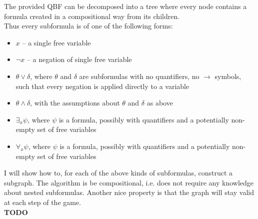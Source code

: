 \noindent
The provided QBF can be decomposed into a tree where every node contains a formula created in a compositional
way from its children.\\
Thus every subformula is of one of the following forms:
\begin{itemize}
      \item $x$ -- a single free variable
      \item $\lnot x$ -- a negation of single free variable
      \item $\theta \lor \delta$, where $\theta$ and $\delta$ are subformulas with no quantifiers, no $\rightarrow$ symbols,
            such that every negation is applied directly to a variable
      \item $\theta \land \delta$, with the assumptions about $\theta$ and $\delta$ as above
      \item $\exists_{x} \psi$, where $\psi$ is a formula, possibly with quantifiers and a potentially non-empty set of
            free variables
      \item $\forall_{x} \psi$, where $\psi$ is a formula, possibly with quantifiers and a potentially non-empty set of
            free variables
\end{itemize}
I will show how to, for each of the above kinds of subformulas, construct a subgraph. The algorithm is
be compositional, i.e. does not require any knowledge about nested subformulas. Another nice property is that
the graph will stay valid at each step of the game.\\

\textbf{TODO}